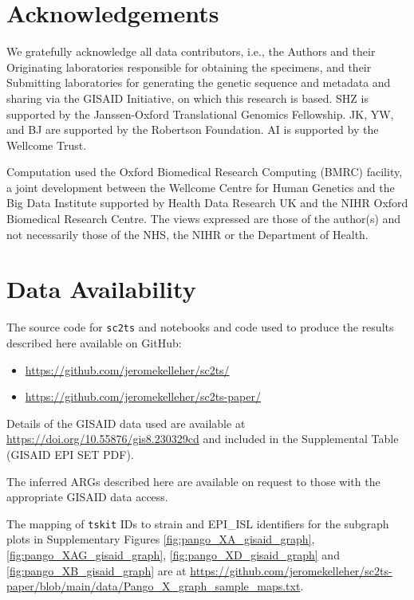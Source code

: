 \documentclass{article}
\begin{document}
\section{Acknowledgements}
We gratefully acknowledge all data contributors, i.e., the Authors and their
Originating laboratories responsible for obtaining the specimens, and their
Submitting laboratories for generating the genetic sequence and metadata and
sharing via the GISAID Initiative, on which this research is based.
SHZ is supported by the Janssen-Oxford Translational Genomics Fellowship. JK,
YW, and BJ are supported by the Robertson Foundation. AI is supported by the Wellcome Trust.

Computation used the Oxford Biomedical Research Computing (BMRC) facility, a
joint development between the Wellcome Centre for Human Genetics and the Big
Data Institute supported by Health Data Research UK and the NIHR Oxford
Biomedical Research Centre. The views expressed are those of the author(s) and
not necessarily those of the NHS, the NIHR or the Department of Health.

\section{Data Availability}
\label{sec-data-availability}
The source code for \texttt{sc2ts} and notebooks and code used to produce the
results described here available on GitHub:
\begin{itemize}
\item \url{https://github.com/jeromekelleher/sc2ts/}
\item \url{https://github.com/jeromekelleher/sc2ts-paper/}
\end{itemize}

Details of the GISAID data used are available at
\url{https://doi.org/10.55876/gis8.230329cd} and included in the
Supplemental Table (GISAID EPI SET PDF).

The inferred ARGs described here are available on request to those with
the appropriate GISAID data access.

The mapping of \texttt{tskit} IDs to strain and EPI\_ISL identifiers for the
subgraph plots in Supplementary Figures \ref{fig:pango_XA_gisaid_graph}, \ref{fig:pango_XAG_gisaid_graph}, \ref{fig:pango_XD_gisaid_graph} and \ref{fig:pango_XB_gisaid_graph} are at
\url{https://github.com/jeromekelleher/sc2ts-paper/blob/main/data/Pango_X_graph_sample_maps.txt}.
\end{document}
